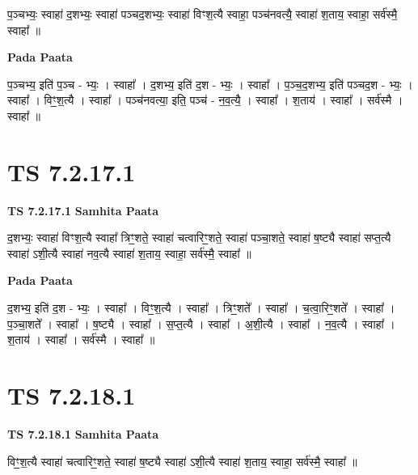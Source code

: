 \documentclass[17pt]{extarticle}
\begin{document}
प॒ञ्चभ्यः॒ स्वाहा॑ द॒शभ्यः॒ स्वाहा॑ पञ्चद॒शभ्यः॒ स्वाहा॑ विꣳश॒त्यै स्वाहा॒ पञ्च॑नवत्यै॒ स्वाहा॑ श॒ताय॒ स्वाहा॒ सर्व॑स्मै॒ स्वाहा᳚ ॥ \newline

\textbf{Pada Paata} \newline

प॒ञ्चभ्य॒ इति॑ प॒ञ्च - भ्यः॒ । स्वाहा᳚ । द॒शभ्य॒ इति॑ द॒श - भ्यः॒ । स्वाहा᳚ । प॒ञ्च॒द॒शभ्य॒ इति॑ पञ्चद॒श - भ्यः॒ । स्वाहा᳚ । विꣳ॒॒श॒त्यै । स्वाहा᳚ । पञ्च॑नवत्या॒ इति॒ पञ्च॑ - न॒व॒त्यै॒ । स्वाहा᳚ । श॒ताय॑ । स्वाहा᳚ । सर्व॑स्मै । स्वाहा᳚ ॥  \newline




\section*{ TS 7.2.17.1 }

\textbf{TS 7.2.17.1 } \newline
\textbf{Samhita Paata} \newline

द॒शभ्यः॒ स्वाहा॑ विꣳश॒त्यै स्वाहा᳚ त्रिꣳ॒॒शते॒ स्वाहा॑ चत्वारिꣳ॒॒शते॒ स्वाहा॑ पञ्चा॒शते॒ स्वाहा॑ ष॒ष्ट्यै स्वाहा॑ सप्त॒त्यै स्वाहा॑ ऽशी॒त्यै स्वाहा॑ नव॒त्यै स्वाहा॑ श॒ताय॒ स्वाहा॒ सर्व॑स्मै॒ स्वाहा᳚ ॥ \newline

\textbf{Pada Paata} \newline

द॒शभ्य॒ इति॑ द॒श - भ्यः॒ । स्वाहा᳚ । विꣳ॒॒श॒त्यै । स्वाहा᳚ । त्रिꣳ॒॒शते᳚ । स्वाहा᳚ । च॒त्वा॒रिꣳ॒॒शते᳚ । स्वाहा᳚ । प॒ञ्चा॒शते᳚ । स्वाहा᳚ । ष॒ष्ट्यै । स्वाहा᳚ । स॒प्त॒त्यै । स्वाहा᳚ । अ॒शी॒त्यै । स्वाहा᳚ । न॒व॒त्यै । स्वाहा᳚ । श॒ताय॑ । स्वाहा᳚ । सर्व॑स्मै । स्वाहा᳚ ॥  \newline




\section*{ TS 7.2.18.1 }

\textbf{TS 7.2.18.1 } \newline
\textbf{Samhita Paata} \newline

विꣳ॒॒श॒त्यै स्वाहा॑ चत्वारिꣳ॒॒शते॒ स्वाहा॑ ष॒ष्ट्यै स्वाहा॑ ऽशी॒त्यै स्वाहा॑ श॒ताय॒ स्वाहा॒ सर्व॑स्मै॒ स्वाहा᳚ ॥ \newline
\end{document}
